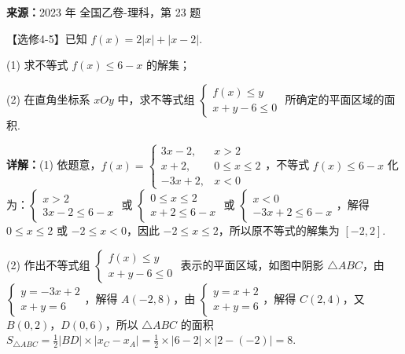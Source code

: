 \begin{question}[points=10]
\textbf{来源：}2023 年 全国乙卷-理科，第 23 题\par
【选修4-5】已知 $f(x)=2|x|+|x-2|$.



(1) 求不等式 $f(x)\le 6-x$ 的解集；



(2) 在直角坐标系 $xOy$ 中，求不等式组 $\begin{cases} f(x)\le y \\ x+y-6\le0 \end{cases}$ 所确定的平面区域的面积.
\begin{solution}

\textbf{详解：}(1) 依题意，$f(x)=\begin{cases} 3x-2, & x>2 \\ x+2, & 0\le x\le2 \\ -3x+2, & x<0 \end{cases}$，不等式 $f(x)\le6-x$ 化为：$\begin{cases} x>2 \\ 3x-2\le6-x \end{cases}$ 或 $\begin{cases} 0\le x\le2 \\ x+2\le6-x \end{cases}$ 或 $\begin{cases} x<0 \\ -3x+2\le6-x \end{cases}$，解得 $0\le x\le2$ 或 $-2\le x<0$，因此 $-2\le x\le2$，所以原不等式的解集为 $[-2,2]$.

(2) 作出不等式组 $\begin{cases} f(x)\le y \\ x+y-6\le0 \end{cases}$ 表示的平面区域，如图中阴影 $\triangle ABC$，由 $\begin{cases} y=-3x+2 \\ x+y=6 \end{cases}$，解得 $A(-2,8)$，由 $\begin{cases} y=x+2 \\ x+y=6 \end{cases}$，解得 $C(2,4)$，又 $B(0,2)$，$D(0,6)$，所以 $\triangle ABC$ 的面积 $S_{\triangle ABC}=\frac{1}{2}|BD|\times|x_C-x_A|=\frac{1}{2}\times|6-2|\times|2-(-2)|=8$.
\end{solution}
\end{question}

